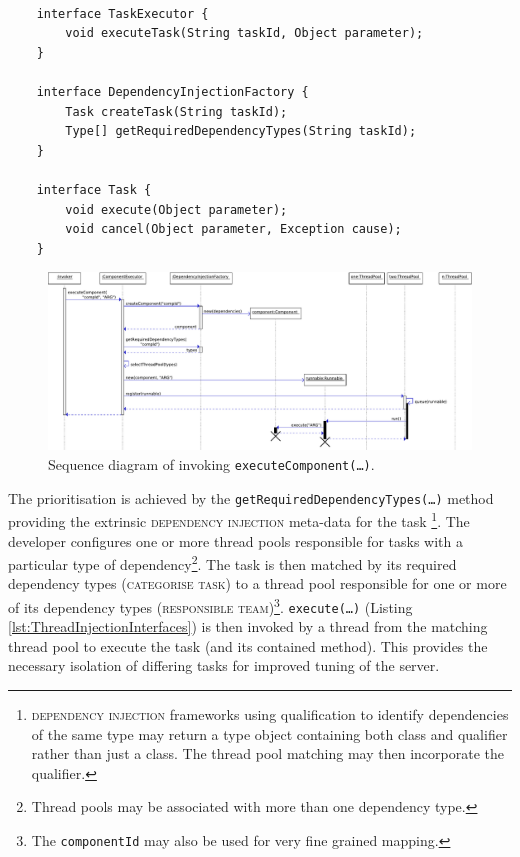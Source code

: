 \documentclass[prodmode]{style/acmlarge}
\begin{document}
\begin{lstlisting}[float,label=lst:ThreadInjectionInterfaces]

    interface TaskExecutor {
        void executeTask(String taskId, Object parameter);
    }

    interface DependencyInjectionFactory {
        Task createTask(String taskId);
        Type[] getRequiredDependencyTypes(String taskId);
    }

    interface Task {
        void execute(Object parameter); 
        void cancel(Object parameter, Exception cause);
    }
\end{lstlisting}


\begin{figure}[!t]
\centering
\includegraphics[width=6in]{ExecuteComponentSequenceDiagram}
\caption{Sequence diagram of invoking \texttt{executeComponent(\ldots)}.}
\label{fig:ExecuteComponentSequenceDiagram}
\end{figure}

The prioritisation is achieved by the
\texttt{getRequiredDependencyTypes(\ldots)} method providing the extrinsic
\textsc{dependency injection} \cite{ioc} meta-data for the task
\footnote{\textsc{dependency injection} frameworks using qualification to
identify dependencies of the same type may return a type object containing both
class and qualifier rather than just a class.  The thread pool matching may then
incorporate the qualifier.}.  The developer configures one or more thread pools
responsible for tasks with a particular type of dependency\footnote{Thread pools
may be associated with more than one dependency type.}.  The task is then
matched by its required dependency types (\textsc{categorise task}) to a thread
pool responsible for one or more of its dependency types (\textsc{responsible
team})\footnote{The \texttt{componentId} may also be used for very fine grained
mapping.}.  \texttt{execute(\ldots)} (Listing
\ref{lst:ThreadInjectionInterfaces}) is then invoked by a thread from the
matching thread pool to execute the task (and its contained method). This
provides the necessary isolation of differing tasks for improved tuning of the
server.
\end{document}
